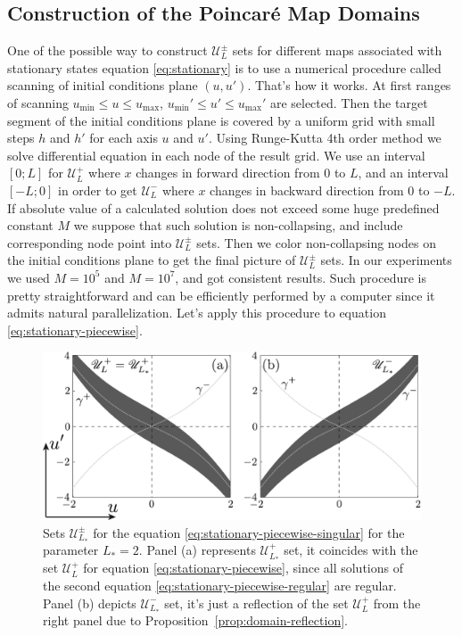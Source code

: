 \subsection{Construction of the Poincar\'e Map Domains}

One of the possible way to construct $\mathscr{U}_L^{\pm}$ sets for different maps associated with stationary states equation \eqref{eq:stationary} is to use a numerical procedure called scanning of initial conditions plane $(u, u')$.
That's how it works.
At first ranges of scanning $u_{\min} \le u \le u_{\max}$, $u_{\min}' \le u' \le u_{\max}'$ are selected.
Then the target segment of the initial conditions plane is covered by a uniform grid with small steps $h$ and $h'$ for each axis $u$ and $u'$.
Using Runge-Kutta 4th order method we solve differential equation in each node of the result grid.
We use an interval $[0; L]$ for $\mathscr{U}_L^+$ where $x$ changes in forward direction from $0$ to $L$, and an interval $[-L; 0]$ in order to get $\mathscr{U}_L^-$ where $x$ changes in backward direction from $0$ to $-L$.
If absolute value of a calculated solution does not exceed some huge predefined constant $M$ we suppose that such solution is non-collapsing, and include corresponding node point into $\mathscr{U}_L^{\pm}$ sets.
Then we color non-collapsing nodes on the initial conditions plane to get the final picture of $\mathscr{U}_L^{\pm}$ sets.
In our experiments we used $M = 10^5$ and $M = 10^7$, and got consistent results.
Such procedure is pretty straightforward and can be efficiently performed by a computer since it admits natural parallelization.
Let's apply this procedure to equation \eqref{eq:stationary-piecewise}.

\begin{figure}[h]
\centering
	\includegraphics[scale = 1]{pic/Poincare map domain for piecewise singular equation}
	\caption{
		Sets $\mathscr{U}_{L_*}^{\pm}$ for the equation \eqref{eq:stationary-piecewise-singular} for the parameter $L_* = 2$.
		Panel (a) represents $\mathscr{U}_{L_*}^+$ set, it coincides with the set $\mathscr{U}_L^+$ for equation \eqref{eq:stationary-piecewise}, since all solutions of the second equation \eqref{eq:stationary-piecewise-regular} are regular.
		Panel (b) depicts $\mathscr{U}_{L_*}^-$ set, it's just a reflection of the set $\mathscr{U}_L^+$ from the right panel due to Proposition~\ref{prop:domain-reflection}.
	}
\label{fig:poincare-map-domain-piecewise}
\end{figure}


